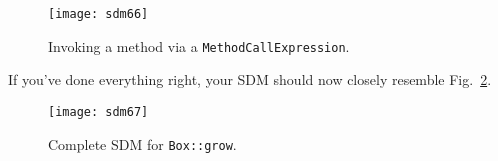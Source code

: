 \begin{figure}[htbp]
\begin{center}
  \texttt{[image: sdm66]}
  \caption{Invoking a method via a \texttt{MethodCallExpression}.}  
  \label{fig:sdm_grow_4} 
\end{center}
\end{figure}
\FloatBarrier

If you've done everything right, your SDM should now closely resemble
Fig.~\ref{fig:sdm_grow_5}.  

\begin{figure}[htbp]
\begin{center}
  \texttt{[image: sdm67]}
  \caption{Complete SDM for \texttt{Box::grow}.}  
  \label{fig:sdm_grow_5}
\end{center}
\end{figure}
